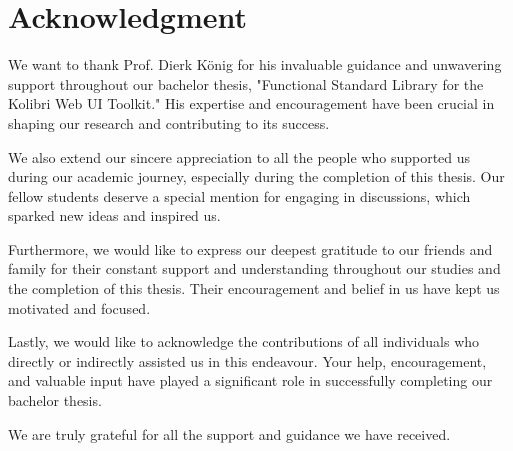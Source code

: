 \chapter{Acknowledgment}
\thispagestyle{empty}
We want to thank Prof. Dierk König for his invaluable guidance and unwavering
support throughout our bachelor thesis, "Functional Standard Library for the
Kolibri Web UI Toolkit." His expertise and encouragement have been crucial in
shaping our research and contributing to its success.

We also extend our sincere appreciation to all the people who supported us
during our academic journey, especially during the completion of this thesis.
Our fellow students deserve a special mention for engaging in discussions,
which sparked new ideas and inspired us.

Furthermore, we would like to express our deepest gratitude to our friends and
family for their constant support and understanding throughout our studies and
the completion of this thesis. Their encouragement and belief in us have kept
us motivated and focused.

Lastly, we would like to acknowledge the contributions of all individuals who
directly or indirectly assisted us in this endeavour. Your help, encouragement,
and valuable input have played a significant role in successfully completing
our bachelor thesis.

We are truly grateful for all the support and guidance we have received.
